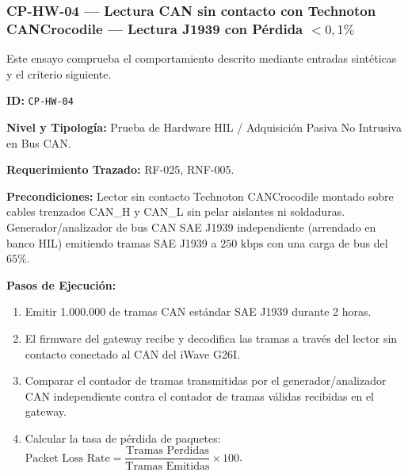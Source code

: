 \subsubsection*{CP-HW-04 — Lectura CAN sin contacto con Technoton CANCrocodile — Lectura J1939 con Pérdida \(< 0{,}1\%\)}\label{sec:9-cp-hw-04}
Este ensayo comprueba el comportamiento descrito mediante entradas sintéticas y el criterio siguiente.

\par\noindent \textbf{ID:} \texttt{CP-\allowbreak{}HW-\allowbreak{}04}\par
\par\noindent \textbf{Nivel y Tipología:} Prueba de Hardware HIL / Adquisición Pasiva No Intrusiva en Bus CAN.\par
\par\noindent \textbf{Requerimiento Trazado:} RF-025, RNF-005.\par
\par\noindent \textbf{Precondiciones:} Lector sin contacto Technoton CANCrocodile montado sobre cables trenzados CAN\_H y CAN\_L sin pelar aislantes ni soldaduras. Generador/analizador de bus CAN SAE J1939 independiente (arrendado en banco HIL) emitiendo tramas SAE J1939 a \(250\text{ kbps}\) con una carga de bus del \(65\%\).\par
\par\noindent \textbf{Pasos de Ejecución:}\par
\begin{enumerate}
\item Emitir 1.000.000 de tramas CAN estándar SAE J1939 durante 2 horas.
\item El firmware del gateway recibe y decodifica las tramas a través del lector sin contacto conectado al CAN del iWave G26I.
\item Comparar el contador de tramas transmitidas por el generador/analizador CAN independiente contra el contador de tramas válidas recibidas en el gateway.
\item Calcular la tasa de pérdida de paquetes: $\text{Packet Loss Rate} = \dfrac{\text{Tramas Perdidas}}{\text{Tramas Emitidas}} \times 100$.
\end{enumerate}

